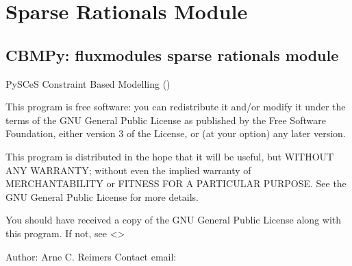 \documentclass[letterpaper,12pt,english]{sphinxmanual}
\begin{document}
\section{Sparse Rationals Module}
\label{\detokenize{api/modules:sparse-rationals-module}}

\subsection{CBMPy: fluxmodules sparse rationals module}
\label{\detokenize{api/modules:cbmpy-fluxmodules-sparse-rationals-module}}\label{\detokenize{api/modules:module-cbmpy.fluxmodules.sparserationals}}
\sphinxAtStartPar
PySCeS Constraint Based Modelling ()

\sphinxAtStartPar
This program is free software: you can redistribute it and/or modify
it under the terms of the GNU General Public License as published by
the Free Software Foundation, either version 3 of the License, or
(at your option) any later version.

\sphinxAtStartPar
This program is distributed in the hope that it will be useful,
but WITHOUT ANY WARRANTY; without even the implied warranty of
MERCHANTABILITY or FITNESS FOR A PARTICULAR PURPOSE.  See the
GNU General Public License for more details.

\sphinxAtStartPar
You should have received a copy of the GNU General Public License
along with this program.  If not, see \textless{}\textgreater{}

\sphinxAtStartPar
Author: Arne C. Reimers
Contact email: 
\end{document}
